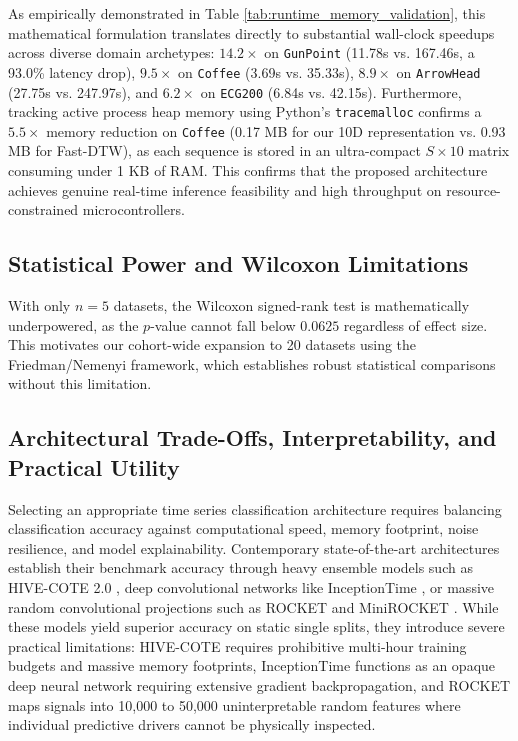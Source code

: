 \documentclass[conference]{IEEEtran}
\begin{document}
As empirically demonstrated in Table \ref{tab:runtime_memory_validation}, this mathematical formulation translates directly to substantial wall-clock speedups across diverse domain archetypes: $14.2\times$ on \texttt{GunPoint} (11.78s vs. 167.46s, a 93.0\% latency drop), $9.5\times$ on \texttt{Coffee} (3.69s vs. 35.33s), $8.9\times$ on \texttt{ArrowHead} (27.75s vs. 247.97s), and $6.2\times$ on \texttt{ECG200} (6.84s vs. 42.15s). Furthermore, tracking active process heap memory using Python's \texttt{tracemalloc} confirms a $5.5\times$ memory reduction on \texttt{Coffee} (0.17 MB for our 10D representation vs. 0.93 MB for Fast-DTW), as each sequence is stored in an ultra-compact $S \times 10$ matrix consuming under 1 KB of RAM. This confirms that the proposed architecture achieves genuine real-time inference feasibility and high throughput on resource-constrained microcontrollers.

\subsection{Statistical Power and Wilcoxon Limitations}
With only $n=5$ datasets, the Wilcoxon signed-rank test is mathematically underpowered, as the $p$-value cannot fall below $0.0625$ regardless of effect size. This motivates our cohort-wide expansion to 20 datasets using the Friedman/Nemenyi framework, which establishes robust statistical comparisons without this limitation.

\subsection{Architectural Trade-Offs, Interpretability, and Practical Utility}
Selecting an appropriate time series classification architecture requires balancing classification accuracy against computational speed, memory footprint, noise resilience, and model explainability. Contemporary state-of-the-art architectures establish their benchmark accuracy through heavy ensemble models such as HIVE-COTE 2.0 \cite{middlehurst2021}, deep convolutional networks like InceptionTime \cite{fawaz2020}, or massive random convolutional projections such as ROCKET and MiniROCKET \cite{dempster2021}. While these models yield superior accuracy on static single splits, they introduce severe practical limitations: HIVE-COTE requires prohibitive multi-hour training budgets and massive memory footprints, InceptionTime functions as an opaque deep neural network requiring extensive gradient backpropagation, and ROCKET maps signals into 10,000 to 50,000 uninterpretable random features where individual predictive drivers cannot be physically inspected.
\end{document}
